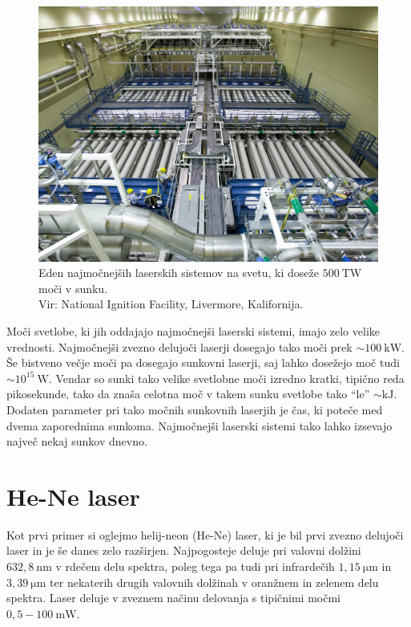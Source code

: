 \begin{figure}[h!]
\centering
\includegraphics[width=100truemm]{slike/07_NIF_Laser_Bay.jpg}
\caption{Eden najmočnejših laserskih sistemov na svetu, ki doseže 
$500~\si{\tera\watt}$ moči v sunku. \\Vir: National Ignition Facility, Livermore, Kalifornija.}
\label{fig:NIF}
\end{figure}

Moči svetlobe, ki jih oddajajo najmočnejši laserski sistemi, imajo zelo velike
vrednosti. Najmočnejši zvezno delujoči laserji dosegajo tako moči prek 
$\sim 100~\si{\kilo\watt}$. Še bistveno večje moči pa dosegajo sunkovni laserji, 
saj lahko dosežejo moč tudi $\sim 10^{15}~\si{\watt}$. 
Vendar so sunki tako velike svetlobne moči izredno kratki, tipično reda pikosekunde, tako da
znaša celotna moč v takem sunku svetlobe tako ``le'' $\sim \si{\kilo\joule}$. Dodaten 
parameter pri tako močnih sunkovnih laserjih je čas, ki poteče med dvema zaporednima
sunkoma. Najmočnejši laserski sistemi tako lahko izsevajo največ nekaj sunkov dnevno. 

\section{He-Ne laser}

Kot prvi primer si oglejmo helij-neon (He-Ne) laser, ki je bil prvi zvezno 
delujoči laser in je še danes zelo razširjen. Najpogosteje deluje 
pri valovni dolžini $632,8~\si{\nano\metre}$ v rdečem delu spektra, poleg 
tega pa tudi pri infrardečih $1,15~\si{\micro\metre}$ in 
$3,39~\si{\micro\metre}$ ter nekaterih drugih
valovnih dolžinah v oranžnem in zelenem delu spektra. Laser deluje v zveznem 
načinu delovanja s tipičnimi močmi $0,5 - 100~\si{\milli\watt}$.


